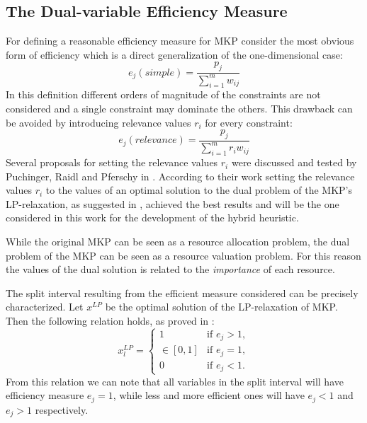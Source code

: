 \subsection{The Dual-variable Efficiency Measure}
\label{subsec:dual}
For defining a reasonable efficiency measure for MKP consider the most obvious
form of efficiency which is a direct generalization of the one-dimensional case:
\begin{displaymath}
	e_j(simple) = \frac{p_j}{\sum_{i=1}^{m} w_{ij}}
\end{displaymath}
In this definition different orders of magnitude of the constraints are not
considered and a single constraint may dominate the others.
This drawback can be avoided by introducing relevance values $r_i$ for every
constraint:
\begin{displaymath}
	e_j(relevance) = \frac{p_j}{\sum_{i=1}^{m} r_i w_{ij}}
\end{displaymath}
Several proposals for setting the relevance values $r_i$ were discussed and
tested by Puchinger, Raidl and Pferschy in \cite{puchinger2006core}.
According to their work setting the relevance values $r_i$ to the values of an
optimal solution to the dual problem of the MKP's LP-relaxation, as suggested
in \cite{Chu-Beasley-1998}, achieved the best results and will be the one
considered in this work for the development of the hybrid heuristic.

While the original MKP can be seen as a resource allocation problem,
the dual problem of the MKP can be seen as a resource valuation problem.
For this reason the values of the dual solution is related to the
\emph{importance} of each resource.

The split interval resulting from the efficient measure considered can be
precisely characterized.
Let $x^{LP}$ be the optimal solution of the LP-relaxation of MKP.
Then the following relation holds, as proved in \cite{puchinger2006core}:
\begin{displaymath}
 x_l^{LP} =
  \begin{cases}
    1         & \mbox{if } e_j > 1, \\
    \in [0,1] & \mbox{if } e_j = 1, \\
    0         & \mbox{if } e_j < 1.
  \end{cases}
\end{displaymath}
From this relation we can note that all variables in the split interval will
have efficiency measure $e_j = 1$, while less and more efficient ones will have
$e_j < 1$ and $e_j > 1$ respectively.

